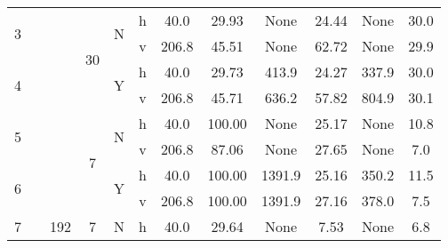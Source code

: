 \documentclass[]{article}
\begin{document}
\begin{table}[]
\begin{tabular}{|c|c|c|c|c|c|c|c|c|c|c|c|}
\multirow{2}{*}{3}         &                     &                       & \multirow{4}{*}{30}  & \multirow{2}{*}{N}                      & h         & 40.0                & 29.93            & None             & 24.44            & None             & 30.0            \\
                           &                     &                       &                      &                                         & v         & 206.8               & 45.51            & None             & 62.72            & None             & 29.9            \\
\multirow{2}{*}{4}         &                     &                       &                      & \multirow{2}{*}{Y}                      & h         & 40.0                & 29.73            & 413.9            & 24.27            & 337.9            & 30.0            \\
                           &                     &                       &                      &                                         & v         & 206.8               & 45.71            & 636.2            & 57.82            & 804.9            & 30.1            \\
\multirow{2}{*}{5}         &                     &                       & \multirow{4}{*}{7}   & \multirow{2}{*}{N}                      & h         & 40.0                & 100.00           & None             & 25.17            & None             & 10.8            \\
                           &                     &                       &                      &                                         & v         & 206.8               & 87.06            & None             & 27.65            & None             & 7.0             \\
\multirow{2}{*}{6}         &                     &                       &                      & \multirow{2}{*}{Y}                      & h         & 40.0                & 100.00           & 1391.9           & 25.16            & 350.2            & 11.5            \\
                           &                     &                       &                      &                                         & v         & 206.8               & 100.00           & 1391.9           & 27.16            & 378.0            & 7.5             \\
\hline
\multirow{2}{*}{7}         &                     & \multirow{8}{*}{192}  & \multirow{4}{*}{7}   & \multirow{2}{*}{N}                      & h         & 40.0                & 29.64            & None             & 7.53             & None             & 6.8             \\

\end{tabular}
\end{table}
\end{document}

